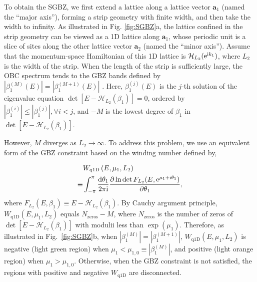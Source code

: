 To obtain the SGBZ, we first extend a lattice along a lattice vector
$\mathbf{a}_{1}$ (named the ``major axis''), forming a strip geometry
with finite width, and then take the width to infinity. As illustrated
in Fig. \ref{fig:SGBZ}a, the lattice confined in the strip geometry
can be viewed as a 1D lattice along $\mathbf{a}_{1}$, whose periodic
unit is a slice of sites along the other lattice vector $\mathbf{a}_{2}$
(named the ``minor axis''). Assume that the momentum-space Hamiltonian
of this 1D lattice is $\mathcal{H}_{L_{2}}(\mathrm{e}^{\mathrm{i} k_{1}})$, where
$L_{2}$ is the width of the strip. When the length of the strip is
sufficiently large, the OBC spectrum tends to the GBZ bands defined
by $|\beta_{1}^{(M)}(E)|=|\beta_{1}^{(M+1)}(E)|$ \cite{yaoEdgeStatesTopological2018,yokomizoNonBlochBandTheory2019}.
Here, $\beta_{1}^{(j)}(E)$ is the $j$-th solution of the eigenvalue
equation $\det[E-\mathcal{H}_{L_{2}}(\beta_{1})]=0$, ordered by $|\beta_{1}^{(i)}|\leq|\beta_{1}^{(j)}|,\forall i<j$,
and $-M$ is the lowest degree of $\beta_{1}$ in $\det[E-\mathcal{H}_{L_{2}}(\beta_{1})]$.

However, $M$ diverges as $L_{2}\rightarrow\infty$. 
To address this problem, we use an equivalent form of the GBZ constraint based on the winding number defined by,

\begin{align}
& W_{\text{q1D}}\left(E,\mu_{1},L_{2}\right) \nonumber \\ 
\equiv & \int_{-\pi}^{\pi}\frac{\mathrm{d}\theta_{1}}{2\pi\mathrm{i}}\frac{\partial\ln\det F_{L_2}(E,\mathrm{e}^{\mu_1+\mathrm{i}\theta_1})}{\partial\theta_{1}},
\end{align}
where $F_{L_2}(E,\beta_1) \equiv E-\mathcal{H}_{L_{2}}(\beta_1)$. 
  By Cauchy argument principle, $W_{\text{q1D}}(E,\mu_{1},L_{2})$ equals $N_{\text{zeros}}-M$, where $N_{\text{zeros}}$ is the number of zeros of $\det[E-\mathcal{H}_{L_{2}}(\beta_{1})]$ with modulii less than $\exp(\mu_1)$. Therefore, as illustrated in Fig.~\ref{fig:SGBZ}b, when $|\beta_1^{(M)}|=|\beta_1^{(M+1)}|$, $W_{\text{q1D}}(E,\mu_1,L_2)$ is negative (light green region) when $\mu_1 < \mu_{1,0}\equiv |\beta_1^{(M)}|$, and positive (light orange region) when $\mu_1 > \mu_{1,0}$. Otherwise, when the GBZ constraint is not satisfied, the regions with positive and negative $W_{\text{q1D}}$ are disconnected.


